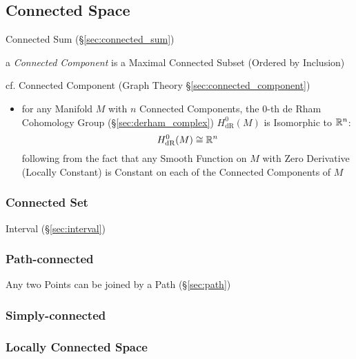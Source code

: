 \subsection{Connected Space}\label{sec:connected_space}

\fist Connected Sum (\S\ref{sec:connected_sum})

a \emph{Connected Component} is a Maximal Connected Subset (Ordered by
Inclusion)

\fist cf. Connected Component (Graph Theory \S\ref{sec:connected_component})

\begin{itemize}
  \item for any Manifold $M$ with $n$ Connected Components, the $0$-th de Rham
    Cohomology Group (\S\ref{sec:derham_complex}) $H_{\mathrm{dR}}^0(M)$ is
    Isomorphic to $\mathbb{R}^n$:
    \[
      H_{\mathrm{dR}}^0(M) \cong \mathbb{R}^n
    \]
    following from the fact that any Smooth Function on $M$ with Zero Derivative
    (Locally Constant) is Constant on each of the Connected Components of $M$
\end{itemize}



\subsubsection{Connected Set}\label{sec:connected_set}

Interval (\S\ref{sec:interval})



\subsubsection{Path-connected}\label{sec:path_connected}

Any two Points can be joined by a Path (\S\ref{sec:path})



\subsubsection{Simply-connected}\label{sec:simply_connected}

\subsubsection{Locally Connected Space}\label{sec:locally_connected}

